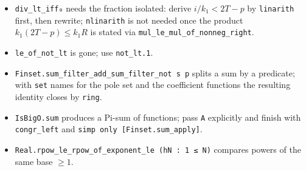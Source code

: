 \documentclass[11pt]{article}
\begin{document}
\begin{itemize}
\item \texttt{div\_lt\_iff₀} needs the fraction isolated: derive $i/k_1<2T-p$ by
\texttt{linarith} first, then rewrite; \texttt{nlinarith} is not needed once the product
$k_1(2T-p)\le k_1R$ is stated via \texttt{mul\_le\_mul\_of\_nonneg\_right}.
\item \texttt{le\_of\_not\_lt} is gone; use \texttt{not\_lt.1}.
\item \texttt{Finset.sum\_filter\_add\_sum\_filter\_not s p} splits a sum by a predicate; with
\texttt{set} names for the pole set and the coefficient functions the resulting identity closes by
\texttt{ring}.
\item \texttt{IsBigO.sum} produces a Pi-sum of functions; pass \texttt{A} explicitly and finish
with \texttt{congr\_left} and \texttt{simp only [Finset.sum\_apply]}.
\item \texttt{Real.rpow\_le\_rpow\_of\_exponent\_le (hN : 1 ≤ N)} compares powers of the same
base $\ge1$.
\end{itemize}
\end{document}
